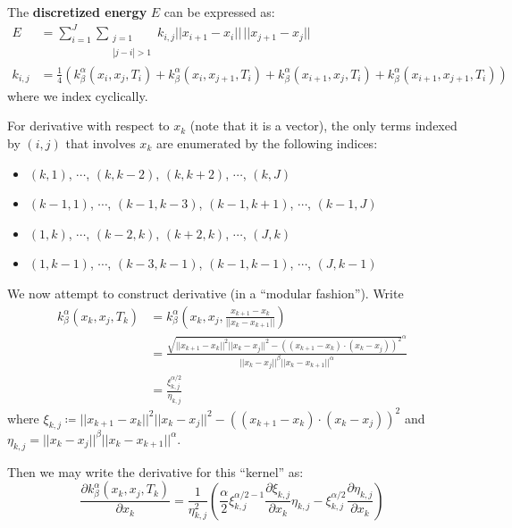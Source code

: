 \documentclass[a4paper]{article}
\newcommand{\norm}[1]{||#1||}
\begin{document}
The \textbf{discretized energy} $E$ can be expressed as:
\begin{align}
    E &= \sum_{i = 1}^{J} \sum_{\substack{j = 1 \\ |j-i| > 1}} k_{i,j} \norm{x_{i+1} - x_i} \, \norm{x_{j+1} - x_j} 
    \label{equ: Discretized Energy}
    \\
    k_{i,j} &= \frac{1}{4} \left( 
        k_{\beta}^{\alpha} \left( x_i, x_j, T_i \right)
        + k_{\beta}^{\alpha} \left( x_i, x_{j+1}, T_i \right)
        + k_{\beta}^{\alpha} \left( x_{i+1}, x_j, T_i \right)
        + k_{\beta}^{\alpha} \left( x_{i+1}, x_{j+1}, T_i \right)
    \right)
\end{align}
where we index cyclically.

For derivative with respect to $x_k$ (note that it is a vector), the only terms indexed by
$(i,j)$ that involves $x_k$ are enumerated by the following indices:
\begin{itemize}
    \item $(k,1)$, $\cdots$, $(k, k-2)$, $(k, k+2)$, $\cdots$, $(k,J)$
    \item $(k-1,1)$, $\cdots$, $(k-1, k-3)$, $(k-1, k+1)$, $\cdots$, $(k-1,J)$
    \item $(1,k)$, $\cdots$, $(k-2, k)$, $(k+2, k)$, $\cdots$, $(J,k)$
    \item $(1,k-1)$, $\cdots$, $(k-3, k-1)$, $(k-1, k-1)$, $\cdots$, $(J,k-1)$
\end{itemize}

We now attempt to construct derivative (in a ``modular fashion'').
Write 
\begin{align}
    k_{\beta}^{\alpha} \left( x_k, x_j, T_k \right) &= k_{\beta}^{\alpha} \left( x_k, x_j, \frac{x_{k+1} - x_{k}}{\norm{x_{k} - x_{k+1}}} \right)
    \\
    &= \frac{\sqrt{\norm{x_{k+1} - x_k}^2 \norm{x_k - x_j}^2- \left( \left( x_{k+1} - x_{k} \right) \cdot \left( x_{k} - x_{j} \right) \right)^2}^{\alpha} }{\norm{x_k - x_j}^{\beta} \norm{x_k - x_{k+1}}^{\alpha}} \\
    &= \frac{\xi_{k,j}^{\alpha/2}}{\eta_{k,j}}
\end{align}
where $\xi_{k,j} \coloneqq \norm{x_{k+1} - x_k}^2 \norm{x_k - x_j}^2- \left( \left( x_{k+1} - x_{k} \right) \cdot \left( x_{k} - x_{j} \right) \right)^2$ and $\eta_{k,j} = \norm{x_k -x_j}^{\beta} \norm{x_k - x_{k+1}}^{\alpha}$.

Then we may write the derivative for this ``kernel'' as:
\begin{equation}
    \frac{\partial k_{\beta}^{\alpha} \left( x_k, x_j, T_k \right)}{\partial x_k} =
\frac{1}{\eta_{k,j}^{2}} \left( \frac{\alpha}{2} \xi_{k,j}^{\alpha/2 - 1} \frac{\partial \xi_{k,j}}{\partial x_k} \eta_{k,j} - \xi_{k,j}^{\alpha/2} \frac{\partial \eta_{k,j}}{\partial x_k} \right)
\end{equation}
\end{document}
